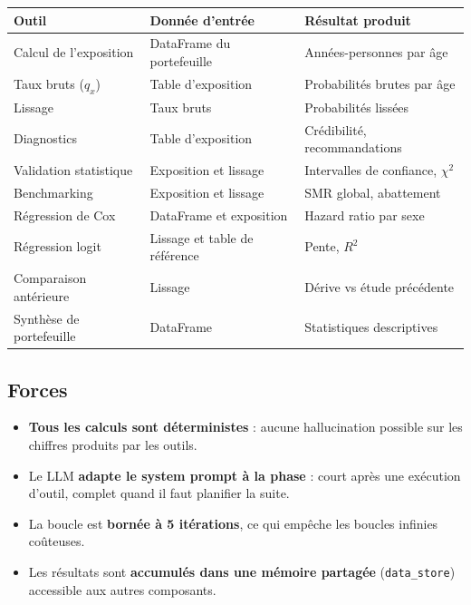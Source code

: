 \documentclass[12pt,a4paper]{article}
\begin{document}
\begin{center}
\begin{tabular}{p{4.5cm} p{4cm} p{4.5cm}}
\toprule
\textbf{Outil} & \textbf{Donnée d'entrée} & \textbf{Résultat produit} \\
\midrule
Calcul de l'exposition  & DataFrame du portefeuille & Années-personnes par âge \\
Taux bruts ($q_x$)      & Table d'exposition        & Probabilités brutes par âge \\
Lissage                 & Taux bruts                & Probabilités lissées \\
Diagnostics             & Table d'exposition        & Crédibilité, recommandations \\
Validation statistique  & Exposition et lissage     & Intervalles de confiance, $\chi^2$ \\
Benchmarking            & Exposition et lissage     & SMR global, abattement \\
Régression de Cox       & DataFrame et exposition   & Hazard ratio par sexe \\
Régression logit        & Lissage et table de référence & Pente, $R^2$ \\
Comparaison antérieure  & Lissage                   & Dérive vs étude précédente \\
Synthèse de portefeuille& DataFrame                 & Statistiques descriptives \\
\bottomrule
\end{tabular}
\end{center}

\subsection{Forces}

\begin{forcebox}
\begin{itemize}[leftmargin=1.5em]
  \item \textbf{Tous les calculs sont déterministes} : aucune hallucination possible
        sur les chiffres produits par les outils.
  \item Le LLM \textbf{adapte le system prompt à la phase} : court après une exécution
        d'outil, complet quand il faut planifier la suite.
  \item La boucle est \textbf{bornée à 5 itérations}, ce qui empêche les boucles
        infinies coûteuses.
  \item Les résultats sont \textbf{accumulés dans une mémoire partagée} (\texttt{data\_store})
        accessible aux autres composants.
\end{itemize}
\end{forcebox}
\end{document}
